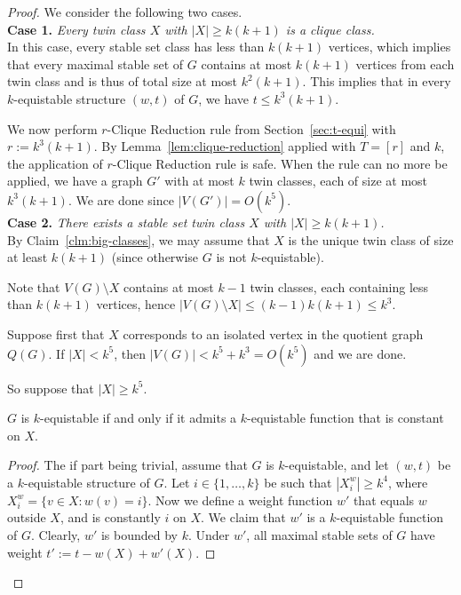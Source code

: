 \documentclass{llncs}
\begin{document}
\begin{proof}
We consider the following two cases.\\

\noindent
\textbf{Case 1.} \emph{Every twin class $X$ with $|X|\ge k(k+1)$ is a clique class.}\\

In this case, every stable set class has less than $k(k+1)$ vertices, which implies that every maximal stable set of $G$ contains at most
$k(k+1)$ vertices from each twin class and is thus of total size at most $k^2(k+1)$.
This implies that in every $k$-equistable structure $(w,t)$ of $G$, we have $t\le k^3(k+1)$.

We now perform $r$-Clique Reduction rule from Section~\ref{sec:t-equi} with $r:=k^3(k+1)$.
By Lemma~\ref{lem:clique-reduction} applied with $T=[r]$ and $k$, the application of $r$-Clique Reduction rule is safe.
When the rule can no more be applied, we have a graph $G'$ with at most $k$ twin classes, each of size at most
$k^3(k+1)$.
We are done since $|V(G')| = O(k^5)$.\\
	
\noindent
\textbf{Case 2.} \emph{There exists a stable set twin class $X$ with $|X|\ge k(k+1)$.}\\

\noindent
By Claim~\ref{clm:big-classes}, we may assume that $X$ is the unique twin class of size at least $k(k+1)$
(since otherwise $G$ is not $k$-equistable).

Note that $V(G)\setminus X$ contains at most $k-1$ twin classes, each containing less than $k(k+1)$ vertices, 
hence $|V(G)\setminus X|\le (k-1)k(k+1) \le k^3$.

Suppose first that $X$ corresponds to an isolated vertex in the quotient graph $Q(G)$.
If $|X|<k^5$, then $|V(G)|<k^5+k^3 = O(k^5)$ and we are done.

So suppose that $|X|\ge k^5$.

\begin{Claim}\label{claim}
$G$ is $k$-equistable if and only if it admits a $k$-equistable function that is constant on $X$.
\end{Claim}

\begin{proof}
The if part being trivial, assume that $G$ is $k$-equistable, and let $(w,t)$ be a $k$-equistable structure of $G$.
Let $i \in \{1,\ldots,k\}$ be such that $|X^w_i | \ge k^4$, where $X^w_i = \{v \in X : w(v) = i\}$.
Now we define a weight function $w'$ that equals $w$ outside $X$, and is constantly $i$ on $X$.
We claim that $w'$ is a $k$-equistable function of $G$. Clearly, $w'$ is bounded by $k$.
Under $w'$, all maximal stable sets of $G$ have weight $t' := t - w(X) + w'(X)$.


\end{proof}
\end{proof}
\end{document}
